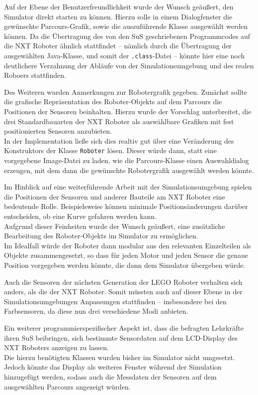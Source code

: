 \documentclass[paper=a4, DIV=calc, BCOR=12mm, twoside=on, onecolumn=on, open = right, titlepage =on, parskip =half-, headsepline = on, footsepline = off, chapterprefix = off, appendixprefix = on, fontsize = 12pt, numbers = noenddot, abstract = on]{scrbook}
\begin{document}
Auf der Ebene der Benutzerfreundlichkeit wurde der Wunsch geäußert, den Simulator direkt starten zu können. Hierzu solle in einem Dialogfenster die gewünschte Parcours-Grafik, sowie die auszuführende Klasse ausgewählt werden können. Da die Übertragung des von den SuS geschriebenen Programmcodes auf die NXT Roboter ähnlich stattfindet -- nämlich durch die Übertragung der ausgewählten Java-Klasse, und somit der \texttt{.class}-Datei -- könnte hier eine noch deutlichere Verzahnung der Abläufe von der Simulationsumgebung und des realen Roboers stattfinden.

Des Weiteren wurden Anmerkungen zur Robotergrafik gegeben. Zunächst sollte die grafische Repräsentation des Roboter-Objekts auf dem Parcours die Positionen der Sensoren beinhalten. Hierzu wurde der Vorschlag unterbreitet, die drei Standardbauarten der NXT Roboter als auswählbare Grafiken mit fest positionierten Sensoren anzubieten.\\
In der Implementation ließe sich dies realtiv gut über eine Veränderung des Konstruktors der Klasse \texttt{Roboter} lösen. Dieser würde dann, statt eine vorgegebene Image-Datei zu laden, wie die Parcours-Klasse einen Auswahldialog erzeugen, mit dem dann die gewünschte Robotergrafik ausgewählt werden könnte.

Im Hinblick auf eine weiterführende Arbeit mit der Simulationsumgebung spielen die Positionen der Sensoren und anderer Bauteile am NXT Roboter eine bedeutende Rolle. Beispielsweise können minimale Positionsänderungen darüber entscheiden, ob eine Kurve gefahren werden kann.\\
Aufgrund dieser Feinheiten wurde der Wunsch geäußert, eine zusätzliche Bearbeitung des Roboter-Objekts im Simulator zu ermöglichen.\\
Im Idealfall würde der Roboter dann modular aus den relevanten Einzelteilen als Objekte zusammengesetzt, so dass für jeden Motor und jeden Sensor die genaue Position vorgegeben werden könnte, die dann dem Simulator übergeben würde.

Auch die Sensoren der nächsten Generation der \textsc{LEGO} Roboter verhalten sich anders, als die der NXT Roboter. Somit müssten auch auf dieser Ebene in der Simulationsumgebungen Anpassungen stattfinden -- insbesondere bei den Farbsensoren, da diese nun drei verschiedene Modi anbieten.

Ein weiterer programmierspezifischer Aspekt ist, dass die befragten Lehrkräfte ihren SuS beibringen, sich bestimmte Sensordaten auf dem LCD-Display des NXT Roboters anzeigen zu lassen.\\
Die hierzu benötigten Klassen wurden bisher im Simulator nicht umgesetzt. Jedoch könnte das Display als weiteres Fenster während der Simulation hinzugefügt werden, sodass auch die Messdaten der Sensoren auf dem ausgewählten Parcours angezeigt würden. 
\end{document}
